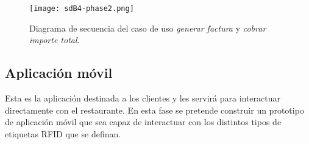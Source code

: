 \begin{itemize}
  \begin{figure}[!h]
    \begin{center}
      \texttt{[image: sdB4-phase2.png]}
      \caption{Diagrama de secuencia del caso de uso \emph{generar factura}
      y \emph{cobrar importe total}.}
      \label{fig:sdB4-phase2}
    \end{center}
  \end{figure}

\end{itemize}

\subsection{Aplicación móvil}
Esta es la aplicación destinada a los clientes y les servirá para interactuar
directamente con el restaurante. En esta fase se pretende construir un
prototipo de aplicación móvil que sea capaz de interactuar con los distintos
tipos de etiquetas \acs{RFID} que se definan.

